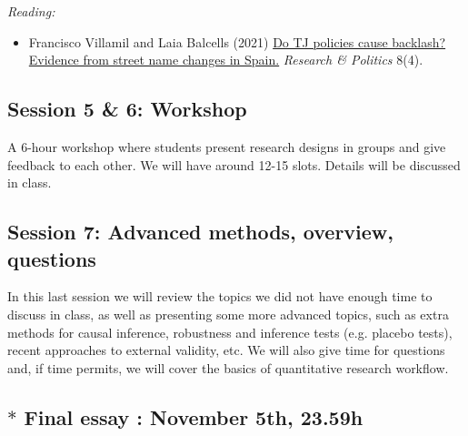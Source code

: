 \documentclass[12pt, a4paper]{article}
\begin{document}
\vspace{15pt}\noindent\textit{Reading:}

\begin{itemize}
  \item Francisco Villamil and Laia Balcells (2021) \href{https://doi.org/10.1177/20531680211058550}{Do TJ policies cause backlash? Evidence from street name changes in Spain.} \textit{Research \& Politics} 8(4).
\end{itemize}

\subsection*{Session 5 \& 6: Workshop}

A 6-hour workshop where students present research designs in groups and give feedback to each other. We will have around 12-15 slots. Details will be discussed in class.

\subsection*{Session 7: Advanced methods, overview, questions}

In this last session we will review the topics we did not have enough time to discuss in class, as well as presenting some more advanced topics, such as extra methods for causal inference, robustness and inference tests (e.g. placebo tests), recent approaches to external validity, etc. We will also give time for questions and, if time permits, we will cover the basics of quantitative research workflow.

\subsection*{$*$ Final essay {\color{red}{deadline}}: November 5th, 23.59h}
\end{document}
